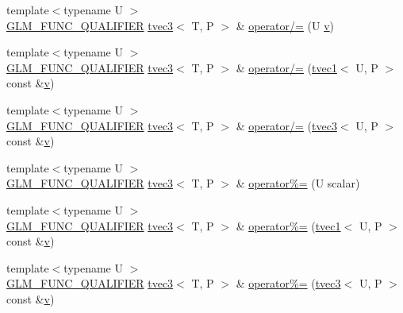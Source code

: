 \begin{DoxyCompactItemize}
\item 
{\footnotesize template$<$typename U $>$ }\\\mbox{\hyperlink{setup_8hpp_a33fdea6f91c5f834105f7415e2a64407}{G\+L\+M\+\_\+\+F\+U\+N\+C\+\_\+\+Q\+U\+A\+L\+I\+F\+I\+ER}} \mbox{\hyperlink{structglm_1_1tvec3}{tvec3}}$<$ T, P $>$ \& \mbox{\hyperlink{structglm_1_1tvec3_ada4a543b6b4fcdc9f364ca0a637f3f6d}{operator/=}} (U \mbox{\hyperlink{glad_8h_a14cfbe2fc2234f5504618905b69d1e06}{v}})
\item 
{\footnotesize template$<$typename U $>$ }\\\mbox{\hyperlink{setup_8hpp_a33fdea6f91c5f834105f7415e2a64407}{G\+L\+M\+\_\+\+F\+U\+N\+C\+\_\+\+Q\+U\+A\+L\+I\+F\+I\+ER}} \mbox{\hyperlink{structglm_1_1tvec3}{tvec3}}$<$ T, P $>$ \& \mbox{\hyperlink{structglm_1_1tvec3_a8a8b6ba0700dfc397fe1bb232193de1d}{operator/=}} (\mbox{\hyperlink{structglm_1_1tvec1}{tvec1}}$<$ U, P $>$ const \&\mbox{\hyperlink{glad_8h_a14cfbe2fc2234f5504618905b69d1e06}{v}})
\item 
{\footnotesize template$<$typename U $>$ }\\\mbox{\hyperlink{setup_8hpp_a33fdea6f91c5f834105f7415e2a64407}{G\+L\+M\+\_\+\+F\+U\+N\+C\+\_\+\+Q\+U\+A\+L\+I\+F\+I\+ER}} \mbox{\hyperlink{structglm_1_1tvec3}{tvec3}}$<$ T, P $>$ \& \mbox{\hyperlink{structglm_1_1tvec3_ad71db80da3ef78d0ac88533c9177ea77}{operator/=}} (\mbox{\hyperlink{structglm_1_1tvec3}{tvec3}}$<$ U, P $>$ const \&\mbox{\hyperlink{glad_8h_a14cfbe2fc2234f5504618905b69d1e06}{v}})
\item 
{\footnotesize template$<$typename U $>$ }\\\mbox{\hyperlink{setup_8hpp_a33fdea6f91c5f834105f7415e2a64407}{G\+L\+M\+\_\+\+F\+U\+N\+C\+\_\+\+Q\+U\+A\+L\+I\+F\+I\+ER}} \mbox{\hyperlink{structglm_1_1tvec3}{tvec3}}$<$ T, P $>$ \& \mbox{\hyperlink{structglm_1_1tvec3_acfb20e1b76ecfdd8487ab0f9d1a9420f}{operator\%=}} (U scalar)
\item 
{\footnotesize template$<$typename U $>$ }\\\mbox{\hyperlink{setup_8hpp_a33fdea6f91c5f834105f7415e2a64407}{G\+L\+M\+\_\+\+F\+U\+N\+C\+\_\+\+Q\+U\+A\+L\+I\+F\+I\+ER}} \mbox{\hyperlink{structglm_1_1tvec3}{tvec3}}$<$ T, P $>$ \& \mbox{\hyperlink{structglm_1_1tvec3_aea61db59d6e74810ebdd814c44d0c7d2}{operator\%=}} (\mbox{\hyperlink{structglm_1_1tvec1}{tvec1}}$<$ U, P $>$ const \&\mbox{\hyperlink{glad_8h_a14cfbe2fc2234f5504618905b69d1e06}{v}})
\item 
{\footnotesize template$<$typename U $>$ }\\\mbox{\hyperlink{setup_8hpp_a33fdea6f91c5f834105f7415e2a64407}{G\+L\+M\+\_\+\+F\+U\+N\+C\+\_\+\+Q\+U\+A\+L\+I\+F\+I\+ER}} \mbox{\hyperlink{structglm_1_1tvec3}{tvec3}}$<$ T, P $>$ \& \mbox{\hyperlink{structglm_1_1tvec3_a4a0e1e225a1525d06c194dec0e966b67}{operator\%=}} (\mbox{\hyperlink{structglm_1_1tvec3}{tvec3}}$<$ U, P $>$ const \&\mbox{\hyperlink{glad_8h_a14cfbe2fc2234f5504618905b69d1e06}{v}})

\end{DoxyCompactItemize}
